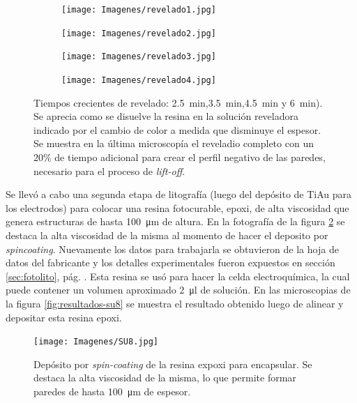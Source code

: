 { 				%
 				\begin{figure}[th!]
			 	   	    \centering
			 	   	    \begin{subfigure}[t]{0.495\textwidth}
			        	\texttt{[image: Imagenes/revelado1.jpg]}
			       		\end{subfigure}
			     		\begin{subfigure}[t]{0.495\textwidth}
			     		\texttt{[image: Imagenes/revelado2.jpg]}
			    		\end{subfigure}
			     		\begin{subfigure}[t]{0.495\textwidth}
						\vspace*{-0.3cm}
			     		\texttt{[image: Imagenes/revelado3.jpg]}
			        	\end{subfigure}
						\begin{subfigure}[t]{0.495\textwidth}
			     		\vspace*{-0.3cm}
			     		\texttt{[image: Imagenes/revelado4.jpg]}
			        	\end{subfigure}
			     		\caption[Revelado en función del tiempo]{Tiempos crecientes de revelado: \SI{2.5}{min},\SI{3.5}{min},\SI{4.5}{min} y \SI{6}{min}). Se aprecia como se disuelve la resina en la solución reveladora indicado por el cambio de color a medida que disminuye el espesor. Se muestra en la última microscopía el reveladio completo con un 20\% de tiempo adicional para crear el perfil negativo de las paredes, necesario para el proceso de\textit{ lift-off}.}
			     		\label{fig:revelado}
			     	   	\end{figure}

 		      Se llevó a cabo una segunda etapa de litografía (luego del depósito de Ti\textbar Au para los electrodos) para colocar una resina fotocurable, epoxi, de alta viscosidad que genera estructuras de hasta \SI{100}{\um} de altura. En la fotografía de la figura \ref{fig:su8} se destaca la alta viscosidad de la misma al momento de hacer el deposito por \textit{spincoating}. Nuevamente los datos para trabajarla se obtuvieron de la hoja de datos del fabricante\cite{Su8,Microchemicals2014} y los detalles experimentales fueron expuestos en  sección \ref{sec:fotolito}, pág. \pageref{sec:fotolito}. Esta resina se usó para hacer la celda electroquímica, la cual puede contener un volumen aproximado \SI{2}{\ul} de solución. En las microscopias de la figura \ref{fig:resultados-su8} se muestra el resultado obtenido luego de alinear y depositar esta resina epoxi.

 				\begin{figure}[h!]
 				\centering
 				\texttt{[image: Imagenes/SU8.jpg]}
 				\caption[Depósito de la resina epoxi SU8]{Depósito por \textit{spin-coating }de la resina expoxi para encapsular. Se destaca la alta viscosidad de la misma, lo que permite formar paredes de hasta \SI{100}{\um} de espesor.}
 				\label{fig:su8}
 				\end{figure}

}
